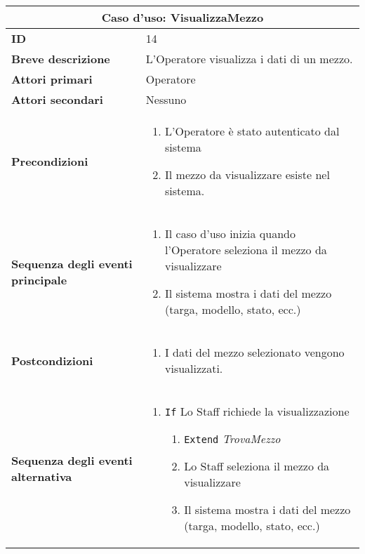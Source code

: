 \documentclass[a4paper]{report}
\begin{document}
\clearpage
\begin{table}[H]
\vspace*{-0cm}
\renewcommand{\arraystretch}{1.9}
\begin{tabular}{|p{3.9cm}|p{9.9cm}|}
\hline
\multicolumn{2}{|c|}{\textbf{Caso d’uso: VisualizzaMezzo}} \\ \hline
	\textbf{ID} & 14 \\ \hline
	\textbf{Breve descrizione} & L'Operatore visualizza i dati di un mezzo. \\ \hline
	\textbf{Attori primari} & Operatore \\ \hline
	\textbf{Attori secondari} & Nessuno \\ \hline
	\textbf{Precondizioni} & \begin{enumerate}[label=\arabic*.,leftmargin=14pt,labelsep=0.5em,topsep=0pt,partopsep=0pt,parsep=0pt,itemsep=0pt]
        \item L’Operatore è stato autenticato dal sistema
        \item Il mezzo da visualizzare esiste nel sistema.
    \end{enumerate} \\ \hline
    	\textbf{Sequenza degli eventi principale} & \begin{enumerate}[label=\arabic*.,leftmargin=14pt,labelsep=0.5em,topsep=0pt,partopsep=0pt,parsep=0pt,itemsep=0pt]
        \item Il caso d'uso inizia quando l'Operatore seleziona il mezzo da visualizzare
        \item Il sistema mostra i dati del mezzo (targa, modello, stato, ecc.)
    \end{enumerate}\\ \hline
    	\textbf{Postcondizioni} & \begin{enumerate}[label=\arabic*.,leftmargin=14pt,labelsep=0.5em,topsep=0pt,partopsep=0pt,parsep=0pt,itemsep=0pt]
        \item I dati del mezzo selezionato vengono visualizzati.
    \end{enumerate}\\ \hline
    	\textbf{Sequenza degli eventi alternativa} & \begin{enumerate}[leftmargin=14pt,label=\arabic*.,labelsep=0.5em,topsep=0pt,partopsep=0pt,parsep=0pt,itemsep=0pt]
        \item \texttt{If} Lo Staff richiede la visualizzazione
        \begin{enumerate}[label=\arabic{enumi}.\arabic*.,leftmargin=22pt,labelsep=0.5em,topsep=0pt,partopsep=0pt,parsep=0pt,itemsep=0pt]
            \item \texttt{Extend} \textit{TrovaMezzo}
            \item Lo Staff seleziona il mezzo da visualizzare
            \item Il sistema mostra i dati del mezzo (targa, modello, stato, ecc.)
        \end{enumerate}
    \end{enumerate} \\ \hline
\end{tabular}
\end{table}
\end{document}
